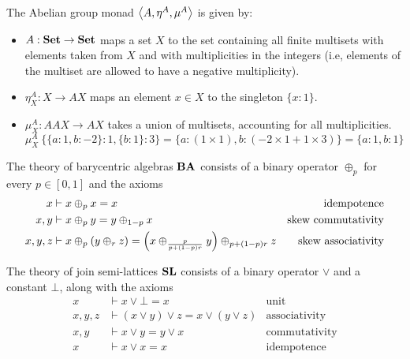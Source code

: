 \begin{definition}
	\label{def:abelian_group_monad}
	The Abelian group monad $\left\langle A, \eta^A, \mu^A \right\rangle$ is given by:
	\begin{itemize}
		\item $A : \mathbf{Set} \to \mathbf{Set}$ maps a set $X$ to the set containing all finite multisets with elements taken from $X$ and with multiplicities in the integers (i.e, elements of the multiset are allowed to have a negative multiplicity).
		\item $\eta_X^A : X \to AX$ maps an element $x \in X$ to the singleton $\{x : 1\}$.
		\item $\mu_X^A : AAX \to AX$ takes a union of multisets, accounting for all multiplicities. $$\mu_X^A\ \{\{a : 1, b : -2\} : 1, \{b : 1\} : 3\} = \{a : (1 \times 1), b : (-2 \times 1 + 1 \times 3)\} = \{a : 1, b : 1\}$$
	\end{itemize}
\end{definition}

\begin{definition}
	\label{def:barycentric_algebras}
	The theory of barycentric algebras ${\mathbf{BA}}$ consists of a binary operator $\oplus_p$ for every $p \in [0, 1]$ and the axioms \begin{align*}
    x &\vdash x \oplus_p x = x &\text{idempotence}\\
    x, y &\vdash x \oplus_p y = y \oplus_{1-p} x &\text{skew commutativity}\\
    x, y, z &\vdash x \oplus_p (y \oplus_r z) = \left( x \oplus_{\frac{p}{p+(1-p)r}} y \right) \oplus_{p + (1-p) r} z &\text{skew associativity}
  \end{align*}
\end{definition}

\begin{definition}
	\label{def:join_semilattices}
  The theory of join semi-lattices ${\mathbf{SL}}$ consists of a binary operator $\vee$ and a constant $\bot$, along with the axioms \begin{align*}
    x &\vdash x \vee \bot = x &\text{unit}\\
    x, y, z &\vdash (x \vee y) \vee z = x \vee (y \vee z) &\text{associativity}\\
    x, y &\vdash x \vee y = y \vee x &\text{commutativity}\\
    x &\vdash x \vee x = x &\text{idempotence}
  \end{align*}
\end{definition}

